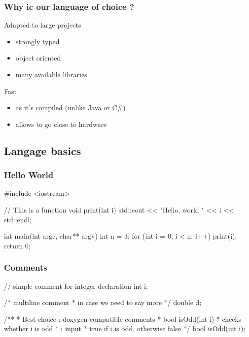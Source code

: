 \begin{frame}
  \frametitle{Why ic \cpp our language of choice ?}
  \pause
  \begin{block}{Adapted to large projects}
    \begin{itemize}
    \item strongly typed
    \item object oriented
    \item many available libraries
    \end{itemize}
  \end{block}
  \pause
  \begin{block}{Fast}
    \begin{itemize}
    \item as it's compiled (unlike Java or C\#)
    \item allows to go close to hardware
    \end{itemize}
  \end{block}
\end{frame}

\subsection[Basics]{Langage basics}

\begin{frame}[fragile]
  \frametitle{Hello World}
  \begin{cppcode}
    #include <iostream>

    // This is a function
    void print(int i) {
      std::cout << "Hello, world " << i << std::endl;
    }

    int main(int argc, char** argv) {
      int n = 3;
      for (int i = 0; i < n; i++) {
        print(i);
      }
      return 0;
    }
  \end{cppcode}
\end{frame}

\begin{frame}[fragile]
  \frametitle{Comments}
  \begin{cppcode}
    // simple comment for integer declaration
    int i;

    /* multiline comment
     * in case we need to say more
     */
    double d;

    /**
     * Best choice : doxygen compatible comments
     * \fn bool isOdd(int i)
     * \brief checks whether i is odd
     * \param i input
     * \return true if i is odd, otherwise false
     */
     bool isOdd(int i);
  \end{cppcode}
\end{frame}

